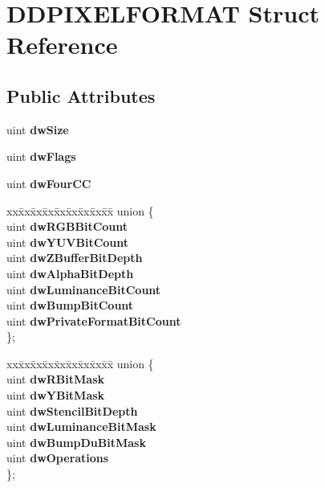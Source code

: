 \hypertarget{struct_d_d_p_i_x_e_l_f_o_r_m_a_t}{}\section{D\+D\+P\+I\+X\+E\+L\+F\+O\+R\+M\+AT Struct Reference}
\label{struct_d_d_p_i_x_e_l_f_o_r_m_a_t}
\subsection*{Public Attributes}
\begin{DoxyCompactItemize}
\item 
\mbox{\label{struct_d_d_p_i_x_e_l_f_o_r_m_a_t_ad57e694d40d45ceed426de894dbfe792}} 
uint {\bfseries dw\+Size}
\item 
\mbox{\label{struct_d_d_p_i_x_e_l_f_o_r_m_a_t_afcd627a47c9b2fb99a2549de9568f325}} 
uint {\bfseries dw\+Flags}
\item 
\mbox{\label{struct_d_d_p_i_x_e_l_f_o_r_m_a_t_ad332a4a4e3972e554afbb349d4d2776c}} 
uint {\bfseries dw\+Four\+CC}
\item 
\mbox{\label{struct_d_d_p_i_x_e_l_f_o_r_m_a_t_aa044ef9c87f30487cee120add36bbabd}} 
\begin{tabbing}
xx\=xx\=xx\=xx\=xx\=xx\=xx\=xx\=xx\=\kill
union \{\\
\>uint {\bfseries dwRGBBitCount}\\
\>uint {\bfseries dwYUVBitCount}\\
\>uint {\bfseries dwZBufferBitDepth}\\
\>uint {\bfseries dwAlphaBitDepth}\\
\>uint {\bfseries dwLuminanceBitCount}\\
\>uint {\bfseries dwBumpBitCount}\\
\>uint {\bfseries dwPrivateFormatBitCount}\\
\}; \\

\end{tabbing}\item 
\mbox{\label{struct_d_d_p_i_x_e_l_f_o_r_m_a_t_a19d8edbb996bd71622a0f5acd919dd2c}} 
\begin{tabbing}
xx\=xx\=xx\=xx\=xx\=xx\=xx\=xx\=xx\=\kill
union \{\\
\>uint {\bfseries dwRBitMask}\\
\>uint {\bfseries dwYBitMask}\\
\>uint {\bfseries dwStencilBitDepth}\\
\>uint {\bfseries dwLuminanceBitMask}\\
\>uint {\bfseries dwBumpDuBitMask}\\
\>uint {\bfseries dwOperations}\\
\}; \\


\end{tabbing}
\end{DoxyCompactItemize}
